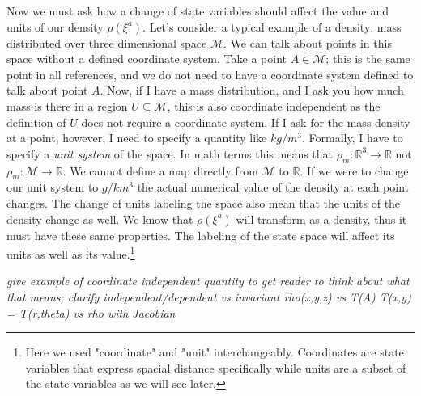 \documentclass{article}
\begin{document}
	Now we must ask how a change of state variables should affect the value and units of our density $\rho(\xi^a)$. Let's consider a typical example of a density: mass distributed over three dimensional space $\mathcal{M}$. We can talk about points in this space without a defined coordinate system. Take a point $A \in \mathcal{M}$; this is the same point in all references, and we do not need to have a coordinate system defined to talk about point $A$. Now, if I have a mass distribution, and I ask you how much mass is there in a region $U \subseteq \mathcal{M}$, this is also coordinate independent as the definition of $U$ does not require a coordinate system. If I ask for the mass density at a point, however, I need to specify a quantity like $kg/m^3$. Formally, I have to specify a \textit{unit system} of the space. In math terms this means that $\rho_m : \mathbb{R}^3 \to \mathbb{R}$ not $\rho_m : \mathcal{M} \to \mathbb{R}$. We cannot define a map directly from $\mathcal{M}$ to $\mathbb{R}$. If we were to change our unit system to $g/km^3$ the actual numerical value of the density at each point changes. The change of units labeling the space also mean that the units of the density change as well. We know that $\rho(\xi^a)$ will transform as a density, thus it must have these same properties. The labeling of the state space will affect its units as well as its value.\footnote{Here we used "coordinate" and "unit" interchangeably. Coordinates are state variables that express spacial distance specifically while units are a subset of the state variables as we will see later.}

\emph{give example of coordinate independent quantity to get reader to think about what that means; clarify independent/dependent vs invariant rho(x,y,z) vs T(A) T(x,y) = T(r,theta) vs rho with Jacobian}
\end{document}
